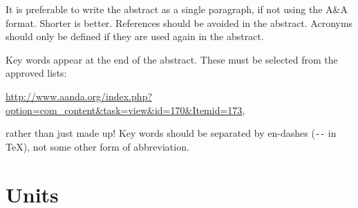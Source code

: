 \documentclass[letterpaper,11pt]{article}
\begin{document}
It is preferable to write the abstract as a single paragraph, if not using the A\&A format.  Shorter is
better.  References should be avoided in the abstract.  Acronyms should only
be defined if they are used again in the abstract.

Key words appear at the end of the abstract.  These must be selected from
the approved lists:

\url{http://www.aanda.org/index.php?option=com_content\&task=view\&id=170\&Itemid=173},

\noindent
rather than just made up!  Key words should be separated by en-dashes (\verb|--| in
\TeX), not some other form of abbreviation.


\section{Units}
\end{document}
